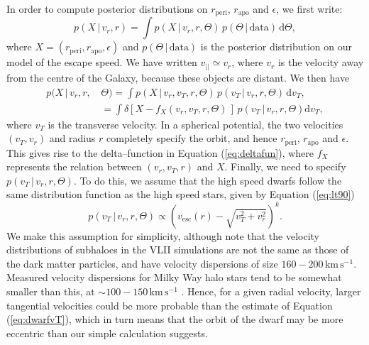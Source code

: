 \documentclass[useAMS,twocolumn,usenatbib]{mn2e}
\def\kms{{\,\mathrm{km\,s^{-1}}}}
\def\vlos{{v_{||}}}
\def\vesc{{v_\mathrm{esc}}}
\def\intd{{\mathrm{d}}}
\def\rp{{r_\mathrm{peri}}}
\def\ra{{r_\mathrm{apo}}}
\def\ecc{{\epsilon}}
\begin{document}
In order to compute posterior distributions on $\rp$, $\ra$ and $\ecc$, we first write:
%
\begin{equation}
p(X\,|\,v_r,r) = \int p(X\,|\,v_r,r,\Theta)\,p(\Theta\,|\,\mathrm{data})\,\intd \Theta,
\label{eq:dwarfpost}
\end{equation}
%
where $X = (\rp,\ra,\ecc)$ and $p(\Theta\,|\,\mathrm{data})$ is the posterior distribution on our model of the escape speed. 
We have written $\vlos \simeq v_r$, where $v_r$ is the velocity away from the centre of the Galaxy, because these objects are distant.  
We then have
%
\begin{align}
p(X\,|\,v_r,r,\,&\Theta) = \int p(X\,|\,v_r,v_T,r,\Theta)\,p(v_T\,|\,v_r,r,\Theta)\,\intd v_T, \nonumber \\
                     &= \int \delta\left[X - f_X(v_r,v_T,r,\Theta)\,\right]\,p(v_T\,|\,v_r,r,\Theta) \intd v_T,
\label{eq:deltafun}
\end{align}
%
where $v_T$ is the transverse velocity. 
In a spherical potential, the two velocities $(v_T,v_r)$ and radius $r$ completely specify the orbit, and hence $\rp$, $\ra$ and $\ecc$. 
This gives rise to the delta--function in Equation (\ref{eq:deltafun}), where $f_X$ represents the relation between $(v_r,v_T,r)$ and $X$. 
Finally, we need to specify $p(v_T\,|\,v_r,r,\Theta)$. 
To do this, we assume that the high speed dwarfs follow the same distribution function as the high speed stars, given by Equation (\ref{eq:lt90})
%
\begin{equation}
p(v_T\,|\,v_r,r,\Theta) \propto \left(\vesc(r) - \sqrt{v_T^2+v_r^2}\right)^k.
\label{eq:dwarfvT} 
\end{equation}
%
We make this assumption for simplicity, although \citet{Er16} note that the velocity distributions of subhaloes in the VLII simulations \citep{Di08} are not the same as those of the dark matter particles, and have velocity dispersions of size $160-200\kms$.
Measured velocity dispersions for Milky Way halo stars tend to be somewhat smaller than this, at $\sim 100-150\kms$ \citep{Ev16}.
Hence, for a given radial velocity, larger tangential velocities could be more probable than the estimate of Equation (\ref{eq:dwarfvT}), which in turn means that the orbit of the dwarf may be more eccentric than our simple calculation suggests.
\end{document}
